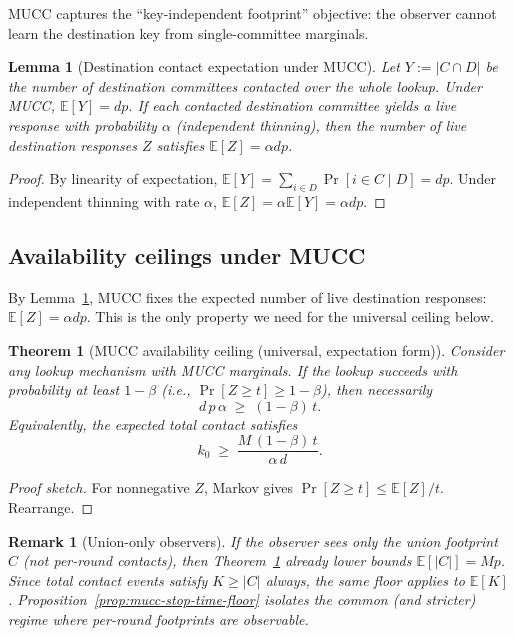 \documentclass[11pt]{article}
\newtheorem{theorem}{Theorem}
\newtheorem{lemma}{Lemma}
\newtheorem{remark}{Remark}
\newcommand{\E}{\mathbb{E}}
\begin{document}
MUCC captures the ``key-independent footprint'' objective: the observer cannot learn the destination key from single-committee marginals.

\begin{lemma}[Destination contact expectation under MUCC]
\label{lem:mucc-dest-exp}
Let $Y:=|C\cap D|$ be the number of destination committees contacted over the whole lookup.
Under MUCC, $\E[Y]=dp$.
If each contacted destination committee yields a live response with probability $\alpha$ (independent thinning), then the number of live destination responses $Z$ satisfies $\E[Z]=\alpha dp$.
\end{lemma}

\begin{proof}
By linearity of expectation, $\E[Y]=\sum_{i\in D}\Pr[i\in C\mid D]=dp$.
Under independent thinning with rate $\alpha$, $\E[Z]=\alpha\E[Y]=\alpha dp$.
\end{proof}

\subsection{Availability ceilings under MUCC}
By Lemma~\ref{lem:mucc-dest-exp}, MUCC fixes the expected number of live destination responses: $\E[Z]=\alpha dp$.
This is the only property we need for the universal ceiling below.

\begin{theorem}[MUCC availability ceiling (universal, expectation form)]
\label{thm:mucc-ceiling}
Consider any lookup mechanism with MUCC marginals.
If the lookup succeeds with probability at least $1-\beta$ (i.e., $\Pr[Z\ge t]\ge 1-\beta$), then necessarily
\[
 d\,p\,\alpha \;\ge\; (1-\beta)\,t.
\]
Equivalently, the expected total contact satisfies
\[
 k_0 \;\ge\; \frac{M\,(1-\beta)\,t}{\alpha\,d}.
\]
\end{theorem}

\begin{proof}[Proof sketch]
For nonnegative $Z$, Markov gives $\Pr[Z\ge t]\le \E[Z]/t$.
Rearrange.
\end{proof}

\begin{remark}[Union-only observers]
If the observer sees only the union footprint $C$ (not per-round contacts), then Theorem~\ref{thm:mucc-ceiling} already lower bounds $\E[|C|]=Mp$.
Since total contact events satisfy $K\ge |C|$ always, the same floor applies to $\E[K]$.
Proposition~\ref{prop:mucc-stop-time-floor} isolates the common (and stricter) regime where per-round footprints are observable.
\end{remark}
\end{document}
